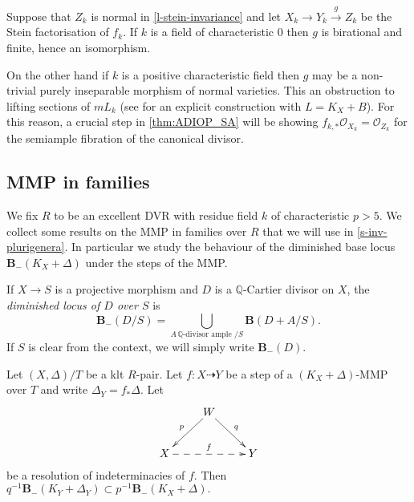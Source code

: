 	\begin{remark}\label{r-connected fibers v contraction}
	Suppose that $Z_{k}$ is normal in \autoref{l-stein-invariance} and let $X_{k}\to Y_{k} \xrightarrow{g} Z_{k}$ be the Stein factorisation of $f_{k}$. If $k$ is a field of characteristic $0$ then $g$ is birational and finite, hence an isomorphism.
	
	On the other hand if $k$ is a positive characteristic field then $g$ may be a non-trivial purely inseparable morphism of normal varieties. This an obstruction to lifting sections of $mL_k$ (see \cite{Bri20} for an explicit construction with $L=K_X+B$). For this reason, a crucial step in \autoref{thm:ADIOP_SA} will be showing $f_{k,*} \mathcal{O}_{X_k}=\mathcal{O}_{Z_k}$ for the semiample fibration of the canonical divisor.
	\end{remark}
	
		
	\subsection{MMP in families}

	We fix $R$ to be an excellent DVR with residue field $k$ of characteristic $p>5$.
	We collect some results on the MMP in families over $R$ that we will use in \autoref{s-inv-plurigenera}. In particular we study the behaviour of the diminished base locus $\mathbf{B}_{-}(K_X+\Delta)$ under the steps of the MMP.
	
	\begin{definition}
	If $X \to S$ is a projective morphism and $D$ is a $\mathbb{Q}$-Cartier divisor on $X$, the \emph{diminished locus of $D$ over $S$}  is  $$\mathbf{B}_{-}(D/S) = \bigcup_{A \, \mathbb{Q}\text{-divisor} \text{ ample }/S} \mathbf{B}(D+A/S).$$
	If $S$ is clear from the context, we will simply write $\mathbf{B}_{-}(D)$.
	\end{definition}

	\begin{lemma}\label{l-stable-base-loci}
	Let $(X,\Delta)/T$ be a klt $R$-pair.
	Let $f\colon X \dashrightarrow Y$ be a step of a  $(K_X+\Delta)$-MMP over $T$ and write $\Delta_Y=f_*\Delta$.
	Let
	\begin{equation*}
	\xymatrix{
		& W \ar[dr]^q \ar[dl]_p & \\
		X \ar@{-->}[rr]^{f} & & Y}
	\end{equation*} 
	be a resolution of indeterminacies of $f$.
	Then $q^{-1}\mathbf{B}_{-}(K_Y+\Delta_Y) \subset p^{-1}\mathbf{B}_{-}(K_X+\Delta).$
\end{lemma}

